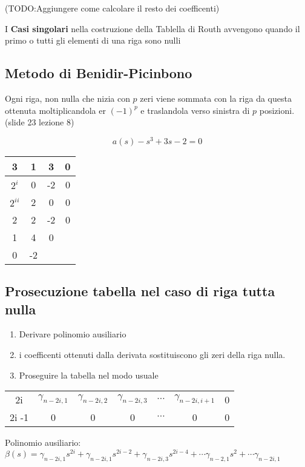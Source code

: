 \documentclass{article}
\begin{document}
(TODO:Aggiungere come calcolare il resto dei coefficenti)

I \textbf{Casi singolari} nella costruzione della Tablella di Routh avvengono quando il primo o tutti gli elementi di una riga sono nulli

\subsection{Metodo di Benidir-Picinbono}
Ogni riga, non nulla che nizia con $p$ zeri viene sommata con la riga da questa ottenuta moltiplicandola er ${(-1)}^p$ e traslandola verso sinistra di $p$ posizioni. (slide 23 lezione 8)

\[ a(s) - s^3 + 3s -2 = 0 \]
\begin{center}
    \begin{tabular} {c|c c c}
        3 & 1 & 3 & 0\\
        \hline
        $2^i$ & 0 & -2 & 0\\
        $2^{ii}$ & 2 & 0 & 0\\
        \hline
        2 & 2 & -2 & 0\\
        1 & 4 & 0\\
        0 & -2
\end{tabular}
\end{center}

\subsection{Prosecuzione tabella nel caso di riga tutta nulla}

\begin{enumerate}
    \item Derivare polinomio ausiliario
    \item i coefficenti ottenuti dalla derivata sostituiscono gli zeri della riga nulla.
    \item Proseguire la tabella nel modo usuale
\end{enumerate}

\begin{center}
    \begin{tabular}{c|c c c c c c}
        2i & $\gamma_{n-2i,1}$ & $\gamma_{n-2i,2}$ & $\gamma_{n-2i,3}$  & $\cdots$ & $\gamma_{n-2i,i+1}$  & 0 \\
        2i -1 & 0 & 0 & 0 & $\cdots$ & 0 & 0
    \end{tabular}
\end{center}

Polinomio ausiliario:
$ \beta(s) = \gamma_{n-2i,1} s^{2i} + \gamma_{n-2i,1} s^{2i-2} +\gamma_{n-2i,3} s^{2i - 4}  + \cdots \gamma_{n-2,1} s^{2} +  \cdots \gamma_{n-2i,1} $
\end{document}

